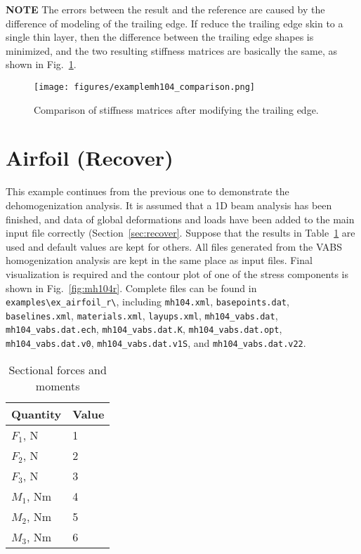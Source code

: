 \documentclass{book}
\begin{document}
\textbf{NOTE} The errors between the result and the reference are caused 
by the difference of modeling of the trailing edge. If reduce the trailing 
edge skin to a single thin layer, then the difference between the trailing 
edge shapes is minimized, and the two resulting stiffness matrices are 
basically the same, as shown in Fig.~\ref{fig:mh104_comparison}.

\begin{figure}[h]
  \centerline{\texttt{[image: figures/examplemh104\_comparison.png]}}
  \caption{Comparison of stiffness matrices after modifying the trailing edge.}
  \label{fig:mh104_comparison}
\end{figure}


\clearpage
\section{Airfoil (Recover)}
\label{eg:airfoil_recover}

This example continues from the previous one to demonstrate the 
dehomogenization analysis. It is assumed that a 1D beam analysis has 
been finished, and data of global deformations and loads have been added 
to the main input file correctly (Section~\ref{sec:recover}. Suppose 
that the results in Table~\ref{table:mh104_1dresults} are used and default 
values are kept for others. All files generated from the VABS homogenization 
analysis are kept in the same place as input files. Final visualization 
is required and the contour plot of one of the stress components is 
shown in Fig.~\ref{fig:mh104r}. Complete files can be found in 
\lstinline{examples\ex_airfoil_r\}, including \lstinline{mh104.xml}, 
\lstinline{basepoints.dat}, \lstinline{baselines.xml}, \lstinline{materials.xml}, 
\lstinline{layups.xml}, \lstinline{mh104_vabs.dat}, \lstinline{mh104_vabs.dat.ech}, 
\lstinline{mh104_vabs.dat.K}, \lstinline{mh104_vabs.dat.opt}, 
\lstinline{mh104_vabs.dat.v0}, \lstinline{mh104_vabs.dat.v1S}, and 
\lstinline{mh104_vabs.dat.v22}.

\begin{table}[h]
  \centering
  \caption{Sectional forces and moments}
  \begin{tabular}{ll}
    \toprule
    Quantity & Value \\
    \midrule
    $F_1$, N & 1 \\
    $F_2$, N & 2 \\
    $F_3$, N & 3 \\
    $M_1$, Nm & 4 \\
    $M_2$, Nm & 5 \\
    $M_3$, Nm & 6 \\
    \bottomrule
  \end{tabular}
  \label{table:mh104_1dresults}
\end{table}
\end{document}
